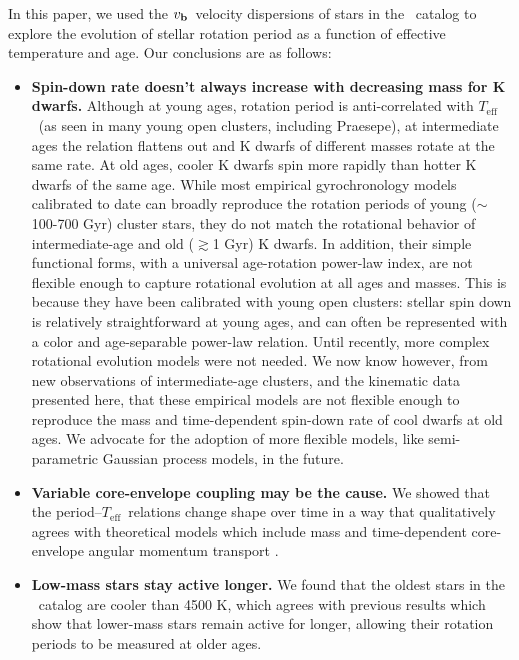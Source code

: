 \documentclass{aastex63}
\newcommand{\teff}{$T_{\mathrm{eff}}$}
\newcommand{\vb}{$v_{\bf b}$}
\newcommand{\mct}{\citet{mcquillan2014}}
\newcommand{\racomment}[1]{{\color{black}#1}}
\begin{document}
In this paper, we used the \vb\ velocity dispersions of stars in the \mct\
catalog to explore the evolution of stellar rotation period as a function of
effective temperature and age.
Our conclusions are as follows:
\begin{itemize}
\item{{\bf Spin-down rate doesn't always increase with decreasing mass for K
    dwarfs.}
Although at young ages, rotation period is anti-correlated with \teff\ (as
seen in many young open clusters, including Praesepe), at intermediate ages the
relation flattens out and K dwarfs of different masses rotate at the same
rate.
At old ages, cooler K dwarfs spin more rapidly than hotter K dwarfs of the
same age.
        \racomment{ While most empirical gyrochronology models calibrated to
        date can broadly reproduce the rotation periods of young
        ($\sim$100-700 Gyr) cluster stars, they do not match the rotational
        behavior of intermediate-age and old ($\gtrsim$1 Gyr) K dwarfs.
In addition, their simple functional forms, with a universal age-rotation
        power-law index, are not flexible enough to capture rotational
        evolution at all ages and masses.
This is because they have been calibrated with young open clusters: stellar
        spin down is relatively straightforward at young ages, and can often
        be represented with a color and age-separable power-law relation.
Until recently, more complex rotational evolution models were not needed.
We now know however, from new observations of intermediate-age clusters, and
        the kinematic data presented here, that these empirical models are not
        flexible enough to reproduce the mass and time-dependent spin-down
        rate of cool dwarfs at old ages.
We advocate for the adoption of more flexible models, like semi-parametric
        Gaussian process models, in the future.
        }
        }

\item{{\bf Variable core-envelope coupling may be the cause.} We showed that
the period--\teff\ relations change shape over time in a way that
qualitatively agrees with theoretical models which include mass and
time-dependent core-envelope angular momentum transport \citep{spada2019}.}

\item{{\bf Low-mass stars stay active longer.}
We found that the oldest stars in the \mct\ catalog are cooler than 4500
K, which agrees with previous results which show that lower-mass stars remain
        active for longer, allowing their rotation periods to be measured at
        older ages.}


\end{itemize}
\end{document}
